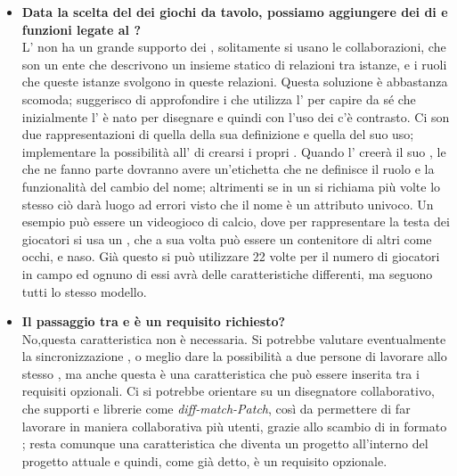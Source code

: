 \begin{itemize}
	   	\item 
	   		\textbf{Data la scelta del  dei giochi da tavolo, possiamo aggiungere dei  di  e funzioni legate al ?} \\
	    	\justifying     		
L' non ha un grande supporto dei , solitamente si usano le collaborazioni, che son un ente che descrivono un insieme statico di relazioni tra istanze, e i ruoli che queste istanze svolgono in queste relazioni. Questa soluzione è abbastanza scomoda; suggerisco di approfondire i  che utilizza l' per capire da sé che inizialmente l' è nato per disegnare  e quindi con l'uso dei  c'è contrasto. 
Ci son due rappresentazioni di  quella della sua definizione e quella del suo uso; implementare la possibilità all' di crearsi i propri . Quando l' creerà il suo , le  che ne fanno parte dovranno avere un'etichetta che ne definisce il ruolo e la funzionalità del cambio del nome; altrimenti se in un  si richiama più volte lo stesso  ciò darà luogo ad errori visto che il nome è un attributo univoco. Un esempio può essere un videogioco di calcio, dove per rappresentare la testa dei giocatori si usa un , che a sua volta può essere un contenitore di altri  come occhi, e naso. Già questo  si può utilizzare 22 volte per il numero di giocatori in campo ed ognuno di essi avrà delle caratteristiche differenti, ma seguono tutti lo stesso modello.
\\
	  		   	\item 
	   		\textbf{Il passaggio tra  e  è un requisito richiesto?} \\
	    	\justifying     		
No,questa caratteristica non è necessaria. Si potrebbe valutare eventualmente la sincronizzazione , o meglio dare la possibilità a due persone di lavorare allo stesso , ma anche questa è una caratteristica che può essere inserita tra i requisiti opzionali. Ci si potrebbe orientare su un disegnatore collaborativo, che supporti  e librerie come \emph{diff-match-Patch}, così da permettere di far lavorare in maniera collaborativa più utenti, grazie allo scambio di  in formato ; resta comunque una caratteristica che diventa un progetto all'interno del progetto attuale e quindi, come già detto, è un requisito opzionale.

\end{itemize}
